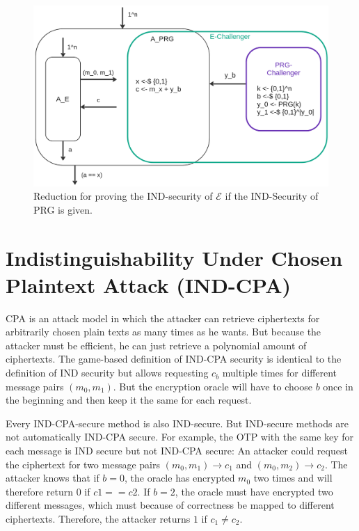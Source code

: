 \begin{figure}
    \center
    \includegraphics[width=\linewidth]{gfx/reduction_prg_key_expansion.png}
    \caption{Reduction for proving the IND-security of $\mathcal{E}$ if the IND-Security of PRG is given.}
    \label{fig:reduction_key_expansion}
\end{figure}


\section{Indistinguishability Under Chosen Plaintext Attack (IND-CPA)}

CPA is an attack model in which the attacker can retrieve ciphertexts for arbitrarily chosen plain texts as many times as he wants. But because the attacker must be efficient, he can just retrieve a polynomial amount of ciphertexts. The game-based definition of IND-CPA security is identical to the definition of IND security but allows requesting $c_b$ multiple times for different message pairs $(m_0, m_1)$. But the encryption oracle will have to choose $b$ once in the beginning and then keep it the same for each request.

Every IND-CPA-secure method is also IND-secure. But IND-secure methods are not automatically IND-CPA secure. For example, the OTP with the same key for each message is IND secure but not IND-CPA secure: An attacker could request the ciphertext for two message pairs $(m_0, m_1) \rightarrow c_1$ and $(m_0, m_2) \rightarrow c_2$. The attacker knows that if $b=0$, the oracle has encrypted $m_0$ two times and will therefore return $0$ if $c1 == c2$. If $b=2$, the oracle must have encrypted two different messages, which must because of correctness be mapped to different ciphertexts. Therefore, the attacker returns $1$ if $c_1 \neq c_2$.

